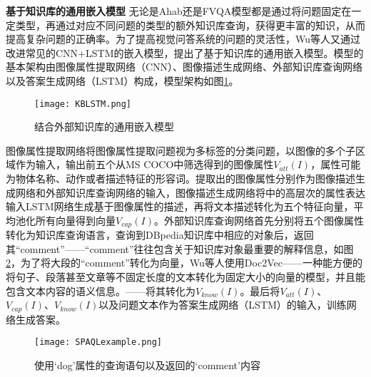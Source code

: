 \textbf{基于知识库的通用嵌入模型}
无论是Ahab还是FVQA模型都是通过将问题固定在一定类型，再通过对应不同问题的类型的额外知识库查询，获得更丰富的知识，从而提高复杂问题的正确率。为了提高视觉问答系统的问题的灵活性，Wu等人又通过改进常见的CNN+LSTM的嵌入模型，提出了基于知识库的通用嵌入模型。模型的基本架构由图像属性提取网络（CNN）、图像描述生成网络、外部知识库查询网络以及答案生成网络（LSTM）构成，模型架构如图\ref{KBLSTM}。
\begin{figure}[H]
	\centering
	\texttt{[image: KBLSTM.png]}
	\caption{结合外部知识库的通用嵌入模型}
	\label{KBLSTM}
\end{figure}

图像属性提取网络将图像属性提取问题视为多标签的分类问题，以图像的多个子区域作为输入，输出前五个从MS COCO中筛选得到的图像属性$V_{att}(I)$，属性可能为物体名称、动作或者描述特征的形容词。提取出的图像属性分别作为图像描述生成网络和外部知识库查询网络的输入，图像描述生成网络将\cite{wu2016value}中的高层次的属性表达输入LSTM网络生成基于图像属性的描述，再将文本描述转化为五个特征向量，平均池化所有向量得到向量$V_{cap}(I)$。外部知识库查询网络首先分别将五个图像属性转化为知识库查询语言，查询到DBpedia知识库中相应的对象后，返回其“comment”——“comment”往往包含关于知识库对象最重要的解释信息，如图\ref{SPAQLexample}，为了将大段的“comment”转化为向量，Wu等人使用Doc2Vec——一种能方便的将句子、段落甚至文章等不固定长度的文本转化为固定大小的向量的模型，并且能包含文本内容的语义信息。——将其转化为$V_{know}(I)$。最后将$V_{att}(I)$、$V_{cap}(I)$、$V_{know}(I)$以及问题文本作为答案生成网络（LSTM）的输入，训练网络生成答案。
\begin{figure}[H]
	\centering
	\texttt{[image: SPAQLexample.png]}
	\caption{使用‘dog’属性的查询语句以及返回的‘comment’内容}
	\label{SPAQLexample}
\end{figure}

